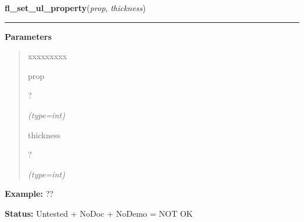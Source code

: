 \hspace{.8\funcindent}\begin{boxedminipage}{\funcwidth}

    \raggedright \textbf{fl\_set\_ul\_property}(\textit{prop}, \textit{thickness})

    \vspace{-1.5ex}

    \rule{\textwidth}{0.5\fboxrule}
\setlength{\parskip}{2ex}
\setlength{\parskip}{1ex}
      \textbf{Parameters}
      \vspace{-1ex}

      \begin{quote}
        \begin{Ventry}{xxxxxxxxx}

          \item[prop]

          ?

            {\it (type=int)}

          \item[thickness]

          ?

            {\it (type=int)}

        \end{Ventry}

      \end{quote}

\textbf{Example:} ??



\textbf{Status:} Untested + NoDoc + NoDemo = NOT OK



    \end{boxedminipage}

    \label{xformslib:flxbasic:fl_set_clipping}

    \vspace{0.5ex}

